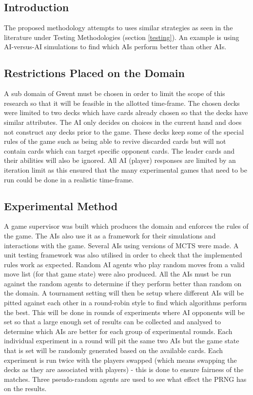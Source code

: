 \documentclass[journal]{IEEEtran}
\begin{document}
  \subsection{Introduction}
  The proposed methodology attempts to uses similar strategies as seen in the literature under Testing Methodologies (section \ref{testing}). An example is using AI-versus-AI simulations to find which AIs perform better than other AIs.
  
  \subsection{Restrictions Placed on the Domain}
  A sub domain of Gwent must be chosen in order to limit the scope of this research so that it will be feasible in the allotted time-frame. The chosen decks were limited to two decks which have cards already chosen so that the decks have similar attributes. The AI only decides on choices in the current hand and does not construct any decks prior to the game. These decks keep some of the special rules of the game such as being able to revive discarded cards but will not contain cards which can target specific opponent cards. The leader cards and their abilities will also be ignored. All AI (player) responses are limited by an iteration limit as this ensured that the many experimental games that need to be run could be done in a realistic time-frame.
  
  \subsection{Experimental Method}
  A game supervisor was built which produces the domain and enforces the rules of the game. The AIs also use it as a framework for their simulations and interactions with the game. Several AIs using versions of MCTS were made. A unit testing framework was also utilised in order to check that the implemented rules work as expected. Random AI agents who play random moves from a valid move list (for that game state) were also produced. 
  All the AIs must be run against the random agents to determine if they perform better than random on the domain. A tournament setting will then be setup where different AIs will be pitted against each other in a round-robin style to find which algorithms perform the best. This will be done in rounds of experiments where AI opponents will be set so that a large enough set of results can be collected and analysed to determine which AIs are better for each group of experimental rounds. Each individual experiment in a round will pit the same two AIs but the game state that is set will be randomly generated based on the available cards. Each experiment is run twice with the players swapped (which means swapping the decks as they are associated with players) - this is done to ensure fairness of the matches. Three pseudo-random agents are used to see what effect the PRNG has on the results.  
  
\end{document}
